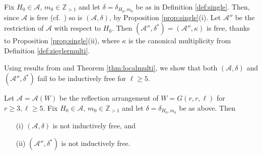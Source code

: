 Fix $H_0 \in {{\mathcal A}}$, $m_0 \in {{\mathbb Z}}_{> 1}$ and let 
$\delta = \delta_{H_0,m_0}$ be
as in Definition \ref{def:single}.
Then, since ${{\mathcal A}}$ is free
(cf.~\cite[\S 6.3]{orlikterao:arrangements}) so is 
$({{\mathcal A}}, \delta)$, by 
Proposition \ref{prop:single}(i).
Let ${{\mathcal A}}''$ be the restriction of ${{\mathcal A}}$ with respect 
to $H_0$.
Then $({{\mathcal A}}'', \delta^*) =  ({{\mathcal A}}'', \kappa)$ is free, 
thanks to Proposition \ref{prop:single}(ii),
where $\kappa$ is the canonical multiplicity
from Definition \ref{def:zieglermulti}.

Using results from \cite{hogeroehrle:indfree}
and Theorem \ref{thm:localmulti}, 
we show that both $({{\mathcal A}}, \delta)$ 
and $({{\mathcal A}}'', \delta^*)$
fail to be inductively free 
for $\ell \ge 5$.

\begin{proposition}
\label{prop:grrl}
Let ${{\mathcal A}} = {{\mathcal A}}(W)$ be the reflection arrangement of 
$W = G(r,r, \ell)$ for $r \ge 3, \ell \ge 5$.
Fix $H_0 \in {{\mathcal A}}$, $m_0 \in {{\mathbb Z}}_{> 1}$ and let 
$\delta = \delta_{H_0,m_0}$ be as above. Then 
\begin{itemize}
\item[(i)] 
$({{\mathcal A}}, \delta)$ is not inductively free, and
\item[(ii)] 
$({{\mathcal A}}'', \delta^*)$ is not inductively free. 
\end{itemize}
\end{proposition}

